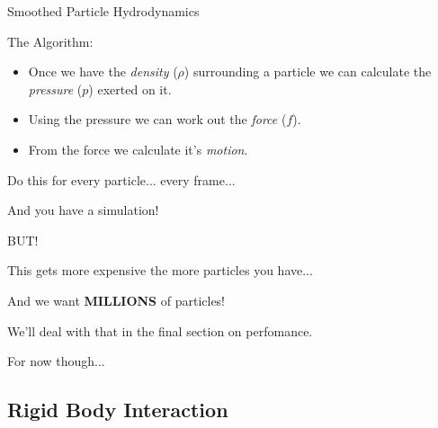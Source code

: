 \documentclass[12pt]{beamer}
\begin{document}

\begin{frame}[t]{Smoothed Particle Hydrodynamics}


\begin{block}{The Algorithm:}

\begin{itemize}
\item Once we have the \emph{density} ($\rho$) surrounding a particle we can calculate the \emph{pressure} ($p$) exerted on it.\pause
\item Using the pressure we can work out the \emph{force} ($f$).\pause
\item From the force we calculate it's \emph{motion}. \pause
\end{itemize}

\begin{center}
\color{white}
\small{Do this for every particle...} \pause \small{every frame...} \pause

\small{And you have a simulation!}
\end{center}

\end{block}

\end{frame}


\begin{frame}[plain]
\begin{center}
	\huge{\alert{BUT!}} \pause
\end{center}

This gets more expensive the more particles you have... \pause

\begin{center}
\color{white}
And we want \textbf{MILLIONS} of particles! \pause
\end{center}


\small{We'll deal with that in the final section on perfomance. \pause

 For now though...}

\end{frame}


\subsection{Rigid Body Interaction}
\end{document}
